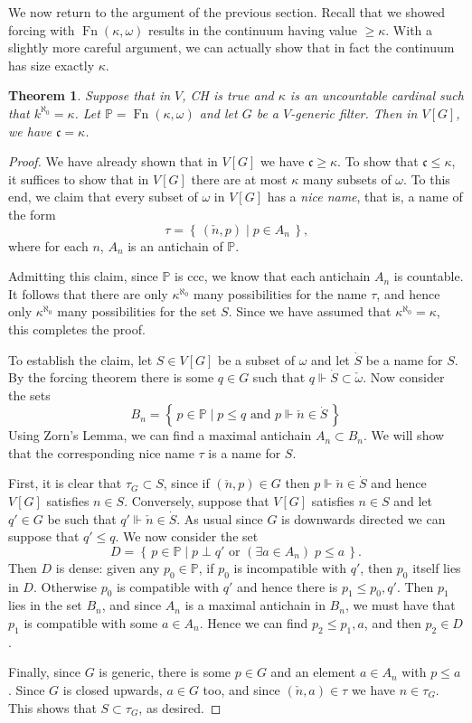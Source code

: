 \documentclass[11pt,oneside,a4paper]{amsbook}
\newcommand{\set}[1]{\left\{\,#1\,\right\}}
\newcommand{\PP}{\mathbb P}
\newcommand{\forces}{\Vdash}
\DeclareMathOperator{\Fn}{Fn}
\theoremstyle{definition}
\theoremstyle{plain}
\newtheorem{theorem}{Theorem}[section]
\theoremstyle{definition}
\theoremstyle{remark}
\numberwithin{equation}{section}
\numberwithin{figure}{section}
\begin{document}
We now return to the argument of the previous section. Recall that we showed forcing with $\Fn(\kappa,\omega)$ results in the continuum having value $\geq\kappa$. With a slightly more careful argument, we can actually show that in fact the continuum has size exactly $\kappa$.

\begin{theorem}
  \label{thm:ch-exact}
  Suppose that in $V$, CH is true and $\kappa$ is an uncountable cardinal such that $k^{\aleph_0}=\kappa$. Let $\PP=\Fn(\kappa,\omega)$ and let $G$ be a $V$-generic filter. Then in $V[G]$, we have $\mathfrak c=\kappa$.
\end{theorem}

\begin{proof}
  We have already shown that in $V[G]$ we have $\mathfrak c\geq\kappa$. To show that $\mathfrak c\leq\kappa$, it suffices to show that in $V[G]$ there are at most $\kappa$ many subsets of $\omega$. To this end, we claim that every subset of $\omega$ in $V[G]$ has a \emph{nice name}, that is, a name of the form
  \[\tau=\set{(\check n,p)\mid p\in A_n}\text{,}
  \]
  where for each $n$, $A_n$ is an antichain of $\PP$.

  Admitting this claim, since $\PP$ is ccc, we know that each antichain $A_n$ is countable. It follows that there are only $\kappa^{\aleph_0}$ many possibilities for the name $\tau$, and hence only $\kappa^{\aleph_0}$ many possibilities for the set $S$. Since we have assumed that $\kappa^{\aleph_0}=\kappa$, this completes the proof.

  To establish the claim, let $S\in V[G]$ be a subset of $\omega$ and let $\dot S$ be a name for $S$. By the forcing theorem there is some $q\in G$ such that $q\forces\dot S\subset\check\omega$. Now consider the sets
  \[B_n=\set{p\in\PP\mid p\leq q\text{ and }p\forces\check n\in\dot S}
  \]
  Using Zorn's Lemma, we can find a maximal antichain $A_n\subset B_n$. We will show that the corresponding nice name $\tau$ is a name for $S$.

  First, it is clear that $\tau_G\subset S$, since if $(\check n,p)\in G$ then $p\forces\check n\in\dot S$ and hence $V[G]$ satisfies $n\in S$. Conversely, suppose that $V[G]$ satisfies $n\in S$ and let $q'\in G$ be such that $q'\forces\check n\in\dot S$. As usual since $G$ is downwards directed we can suppose that $q'\leq q$. We now consider the set
  \[D=\set{p\in\PP\mid p\perp q'\text{ or }(\exists a\in A_n)\;p\leq a}\text{.}
  \]
  Then $D$ is dense: given any $p_0\in\PP$, if $p_0$ is incompatible with $q'$, then $p_0$ itself lies in $D$. Otherwise $p_0$ is compatible with $q'$ and hence there is $p_1\leq p_0,q'$. Then $p_1$ lies in the set $B_n$, and since $A_n$ is a maximal antichain in $B_n$, we must have that $p_1$ is compatible with some $a\in A_n$. Hence we can find $p_2\leq p_1,a$, and then $p_2\in D$.

  Finally, since $G$ is generic, there is some $p\in G$ and an element $a\in A_n$ with $p\leq a$. Since $G$ is closed upwards, $a\in G$ too, and since $(\check n,a)\in\tau$ we have $n\in\tau_G$. This shows that $S\subset\tau_G$, as desired.
\end{proof}
\end{document}

